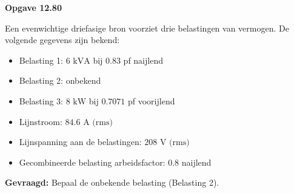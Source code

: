 \documentclass[a4paper,11pt]{article}
\begin{document}
\textbf{Opgave 12.80}

Een evenwichtige driefasige bron voorziet drie belastingen van vermogen. De volgende gegevens zijn bekend:
\begin{itemize}
    \item Belasting 1: $6 \text{ kVA}$ bij $0.83$ pf naijlend
    \item Belasting 2: onbekend
    \item Belasting 3: $8 \text{ kW}$ bij $0.7071$ pf voorijlend
    \item Lijnstroom: $84.6 \text{ A (rms)}$
    \item Lijnspanning aan de belastingen: $208 \text{ V (rms)}$
    \item Gecombineerde belasting arbeidsfactor: $0.8$ naijlend
\end{itemize}

\textbf{Gevraagd:} Bepaal de onbekende belasting (Belasting 2).
\end{document}
